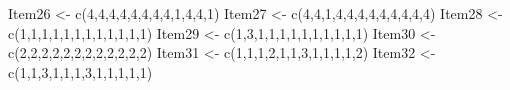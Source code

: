 \documentclass[
  english,
]{book}
\newenvironment{Shaded}{\begin{snugshade}}{\end{snugshade}}
\newcommand{\DecValTok}[1]{\textcolor[rgb]{0.00,0.00,0.81}{#1}}
\newcommand{\FunctionTok}[1]{\textcolor[rgb]{0.00,0.00,0.00}{#1}}
\newcommand{\NormalTok}[1]{#1}
\newcommand{\OtherTok}[1]{\textcolor[rgb]{0.56,0.35,0.01}{#1}}
\begin{document}
\begin{Shaded}
\begin{Highlighting}[]
\NormalTok{Item26 }\OtherTok{\textless{}{-}} \FunctionTok{c}\NormalTok{(}\DecValTok{4}\NormalTok{,}\DecValTok{4}\NormalTok{,}\DecValTok{4}\NormalTok{,}\DecValTok{4}\NormalTok{,}\DecValTok{4}\NormalTok{,}\DecValTok{4}\NormalTok{,}\DecValTok{4}\NormalTok{,}\DecValTok{4}\NormalTok{,}\DecValTok{1}\NormalTok{,}\DecValTok{4}\NormalTok{,}\DecValTok{4}\NormalTok{,}\DecValTok{1}\NormalTok{)}
\NormalTok{Item27 }\OtherTok{\textless{}{-}} \FunctionTok{c}\NormalTok{(}\DecValTok{4}\NormalTok{,}\DecValTok{4}\NormalTok{,}\DecValTok{1}\NormalTok{,}\DecValTok{4}\NormalTok{,}\DecValTok{4}\NormalTok{,}\DecValTok{4}\NormalTok{,}\DecValTok{4}\NormalTok{,}\DecValTok{4}\NormalTok{,}\DecValTok{4}\NormalTok{,}\DecValTok{4}\NormalTok{,}\DecValTok{4}\NormalTok{,}\DecValTok{4}\NormalTok{)}
\NormalTok{Item28 }\OtherTok{\textless{}{-}} \FunctionTok{c}\NormalTok{(}\DecValTok{1}\NormalTok{,}\DecValTok{1}\NormalTok{,}\DecValTok{1}\NormalTok{,}\DecValTok{1}\NormalTok{,}\DecValTok{1}\NormalTok{,}\DecValTok{1}\NormalTok{,}\DecValTok{1}\NormalTok{,}\DecValTok{1}\NormalTok{,}\DecValTok{1}\NormalTok{,}\DecValTok{1}\NormalTok{,}\DecValTok{1}\NormalTok{,}\DecValTok{1}\NormalTok{)}
\NormalTok{Item29 }\OtherTok{\textless{}{-}} \FunctionTok{c}\NormalTok{(}\DecValTok{1}\NormalTok{,}\DecValTok{3}\NormalTok{,}\DecValTok{1}\NormalTok{,}\DecValTok{1}\NormalTok{,}\DecValTok{1}\NormalTok{,}\DecValTok{1}\NormalTok{,}\DecValTok{1}\NormalTok{,}\DecValTok{1}\NormalTok{,}\DecValTok{1}\NormalTok{,}\DecValTok{1}\NormalTok{,}\DecValTok{1}\NormalTok{,}\DecValTok{1}\NormalTok{)}
\NormalTok{Item30 }\OtherTok{\textless{}{-}} \FunctionTok{c}\NormalTok{(}\DecValTok{2}\NormalTok{,}\DecValTok{2}\NormalTok{,}\DecValTok{2}\NormalTok{,}\DecValTok{2}\NormalTok{,}\DecValTok{2}\NormalTok{,}\DecValTok{2}\NormalTok{,}\DecValTok{2}\NormalTok{,}\DecValTok{2}\NormalTok{,}\DecValTok{2}\NormalTok{,}\DecValTok{2}\NormalTok{,}\DecValTok{2}\NormalTok{,}\DecValTok{2}\NormalTok{)}
\NormalTok{Item31 }\OtherTok{\textless{}{-}} \FunctionTok{c}\NormalTok{(}\DecValTok{1}\NormalTok{,}\DecValTok{1}\NormalTok{,}\DecValTok{1}\NormalTok{,}\DecValTok{2}\NormalTok{,}\DecValTok{1}\NormalTok{,}\DecValTok{1}\NormalTok{,}\DecValTok{3}\NormalTok{,}\DecValTok{1}\NormalTok{,}\DecValTok{1}\NormalTok{,}\DecValTok{1}\NormalTok{,}\DecValTok{1}\NormalTok{,}\DecValTok{2}\NormalTok{)}
\NormalTok{Item32 }\OtherTok{\textless{}{-}} \FunctionTok{c}\NormalTok{(}\DecValTok{1}\NormalTok{,}\DecValTok{1}\NormalTok{,}\DecValTok{3}\NormalTok{,}\DecValTok{1}\NormalTok{,}\DecValTok{1}\NormalTok{,}\DecValTok{1}\NormalTok{,}\DecValTok{3}\NormalTok{,}\DecValTok{1}\NormalTok{,}\DecValTok{1}\NormalTok{,}\DecValTok{1}\NormalTok{,}\DecValTok{1}\NormalTok{,}\DecValTok{1}\NormalTok{)}

\end{Highlighting}
\end{Shaded}
\end{document}
